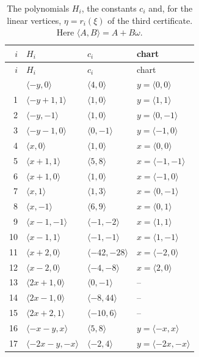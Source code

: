 \documentclass[11pt]{article}
\begin{document}
\begingroup\small
\setlength{\LTcapwidth}{\textwidth}
\begin{longtable}{@{}rlll@{}}
\caption{The polynomials $H_i$, the constants $c_i$ and, for the linear vertices, $\eta=r_i(\xi)$ of the third certificate. Here $\langle A,B\rangle=A+B\omega$.}\label{tab:vert3}\\
\hline $i$ & $H_i$ & $c_i$ & chart\\\hline\endfirsthead\hline $i$ & $H_i$ & $c_i$ & chart\\\hline\endhead\hline\endfoot
0 & $\langle -y,0\rangle$ & $\langle 4,0\rangle$ & $y=\langle 0,0\rangle$\\
1 & $\langle -y+1,1\rangle$ & $\langle 1,0\rangle$ & $y=\langle 1,1\rangle$\\
2 & $\langle -y,-1\rangle$ & $\langle 1,0\rangle$ & $y=\langle 0,-1\rangle$\\
3 & $\langle -y-1,0\rangle$ & $\langle 0,-1\rangle$ & $y=\langle -1,0\rangle$\\
4 & $\langle x,0\rangle$ & $\langle 1,0\rangle$ & $x=\langle 0,0\rangle$\\
5 & $\langle x+1,1\rangle$ & $\langle 5,8\rangle$ & $x=\langle -1,-1\rangle$\\
6 & $\langle x+1,0\rangle$ & $\langle 1,0\rangle$ & $x=\langle -1,0\rangle$\\
7 & $\langle x,1\rangle$ & $\langle 1,3\rangle$ & $x=\langle 0,-1\rangle$\\
8 & $\langle x,-1\rangle$ & $\langle 6,9\rangle$ & $x=\langle 0,1\rangle$\\
9 & $\langle x-1,-1\rangle$ & $\langle -1,-2\rangle$ & $x=\langle 1,1\rangle$\\
10 & $\langle x-1,1\rangle$ & $\langle -1,-1\rangle$ & $x=\langle 1,-1\rangle$\\
11 & $\langle x+2,0\rangle$ & $\langle -42,-28\rangle$ & $x=\langle -2,0\rangle$\\
12 & $\langle x-2,0\rangle$ & $\langle -4,-8\rangle$ & $x=\langle 2,0\rangle$\\
13 & $\langle 2x+1,0\rangle$ & $\langle 0,-1\rangle$ & --\\
14 & $\langle 2x-1,0\rangle$ & $\langle -8,44\rangle$ & --\\
15 & $\langle 2x+2,1\rangle$ & $\langle -10,6\rangle$ & --\\
16 & $\langle -x-y,x\rangle$ & $\langle 5,8\rangle$ & $y=\langle -x,x\rangle$\\
17 & $\langle -2x-y,-x\rangle$ & $\langle -2,4\rangle$ & $y=\langle -2x,-x\rangle$\\

\end{longtable}
\end{document}
